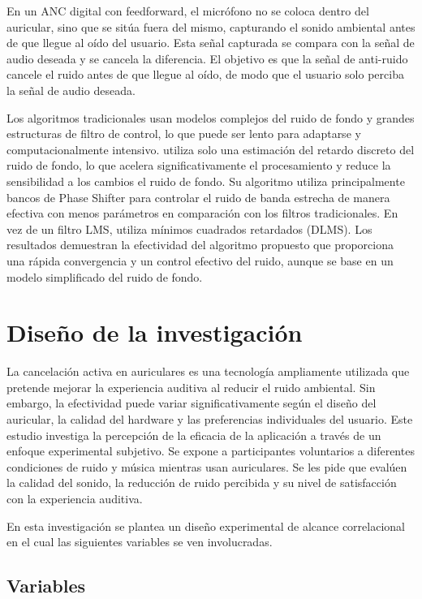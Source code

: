 \documentclass[a4paper,12pt]{article}
\begin{document}
En un ANC digital con feedforward, el micrófono no se coloca dentro del auricular, sino que se sitúa fuera del mismo, capturando el sonido ambiental antes de que llegue al oído del usuario.
Esta señal capturada se compara con la señal de audio deseada y se cancela la diferencia.
El objetivo es que la señal de anti-ruido cancele el ruido antes de que llegue al oído, de modo que el usuario solo perciba la señal de audio deseada.

Los algoritmos tradicionales usan modelos complejos del ruido de fondo y grandes estructuras de filtro de control, lo que puede ser lento para adaptarse y computacionalmente intensivo.
\textcite{Pawelczyk2000} utiliza solo una estimación del retardo discreto del ruido de fondo, lo que acelera significativamente el procesamiento y reduce la sensibilidad a los cambios el ruido de fondo.
Su algoritmo utiliza principalmente bancos de Phase Shifter para controlar el ruido de banda estrecha de manera efectiva con menos parámetros en comparación con los filtros tradicionales.
En vez de un filtro LMS, utiliza mínimos cuadrados retardados (DLMS).
Los resultados demuestran la efectividad del algoritmo propuesto que proporciona una rápida convergencia y un control efectivo del ruido, aunque se base en un modelo simplificado del ruido de fondo.

\section{Diseño de la investigación}

La cancelación activa en auriculares es una tecnología ampliamente utilizada que pretende mejorar la experiencia auditiva al reducir el ruido ambiental. Sin embargo, la efectividad puede variar significativamente según el diseño del auricular, la calidad del hardware y las preferencias individuales del usuario. Este estudio investiga la percepción de la eficacia de la aplicación a través de un enfoque experimental subjetivo. Se expone a participantes voluntarios a diferentes condiciones de ruido y música mientras usan auriculares. Se les pide que evalúen la calidad del sonido, la reducción de ruido percibida y su nivel de satisfacción con la experiencia auditiva.

En esta investigación se plantea un diseño experimental de alcance correlacional en el cual las siguientes variables se ven involucradas.

\subsection{Variables}
\label{sec:variables}
\end{document}
